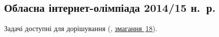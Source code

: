 \renewenvironment{problemAllDefault}[1]{\vspace{10mm}\par\begin{problem}{#1}{Клавіатура (stdin)}{Екран (stdout)}{1 сек}{64 мегабайти}}{\end{problem}}

\subsection{Обласна інтернет-олімпіада 2014/15 н.~р.}

Задачі доступні для дорішування (\EjudgeCkipoName, \href{https://ejudge.ckipo.edu.ua/cgi-bin/new-register?contest_id=18}{змагання \textnumero$\,$18}).

\vspace{-0.5\baselineskip minus 1cm}
	

	

	


